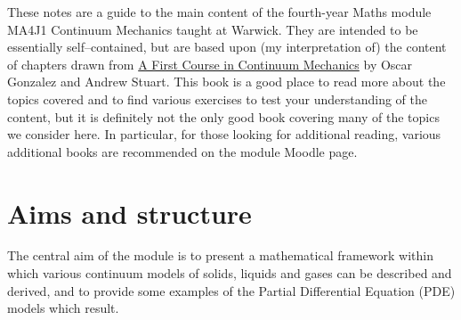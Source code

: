 \documentclass[
  letterpaper,
  DIV=11,
  numbers=noendperiod]{scrreprt}
\theoremstyle{plain}
\theoremstyle{remark}
\begin{document}
\newcommand{\bftau}{{\boldsymbol{\tau}}}
\newcommand{\bfnu}{{\boldsymbol{\nu}}}
\newcommand{\bfpsi}{{\boldsymbol{\psi}}}
\newcommand{\bfphi}{{\boldsymbol{\varphi}}}
\newcommand{\bfSigma}{{\boldsymbol{\Sigma}}}
\newcommand{\calI}{{\mathcal{I}}}
\newcommand{\calN}{{\mathcal{N}}}
\newcommand{\calV}{{\mathcal{V}}}
\newcommand{\bbE}{{\mathbb{E}}}
\newcommand{\bbR}{{\mathbb{R}}}
\newcommand{\bbC}{{\mathbb{C}}}
\newcommand{\bsfC}{{\mathsf{C}}}
\newcommand{\bsfD}{{\mathsf{D}}}
\newcommand{\bsfI}{{\mathsf{I}}}
\newcommand{\bsfO}{{\mathsf{O}}}
\newcommand{\tr}{{\operatorname{tr}}}
\newcommand{\sym}{{\operatorname{sym}}}
\newcommand{\skw}{{\operatorname{skew}}}
\newcommand{\vc}{{\operatorname{vec}}}
\newcommand{\ten}{{\operatorname{ten}}}
\newcommand{\cof}{{\operatorname{cof}}}
\newcommand{\mass}{{\operatorname{mass}}}
\newcommand{\vol}{{\operatorname{vol}}}
\newcommand{\area}{{\operatorname{area}}}
\newcommand{\com}{{\operatorname{com}}}
\newcommand{\cov}{{\operatorname{cov}}}
\newcommand{\e}{{\mathrm{e}}}
\newcommand{\D}{{\mathrm{D}}}
\newcommand{\dd}{{\mathrm{d}}}
\newcommand{\dt}{{\dd t}}
\newcommand{\Dt}{{\D t}}
\newcommand{\bigO}{{O}}
\newcommand{\litO}{{o}}
\newcommand{\dVx}{{\,\d V_{\bfx}}}
\newcommand{\dAx}{{\,\d A_{\bfx}}}
\newcommand{\dVy}{{\,\d V_{\bfy}}}
\newcommand{\dAy}{{\,\d A_{\bfy}}}
\newcommand{\ds}{{\,\d s}}

These notes are a guide to the main content of the fourth-year Maths
module MA4J1 Continuum Mechanics taught at Warwick. They are intended to
be essentially self--contained, but are based upon (my interpretation
of) the content of chapters drawn from
\href{https://go.exlibris.link/CMjyhLvJ}{A First Course in Continuum
Mechanics} by Oscar Gonzalez and Andrew Stuart. This book is a good
place to read more about the topics covered and to find various
exercises to test your understanding of the content, but it is
definitely not the only good book covering many of the topics we
consider here. In particular, for those looking for additional reading,
various additional books are recommended on the module Moodle page.

\section*{Aims and structure}\label{aims-and-structure}


The central aim of the module is to present a mathematical framework
within which various continuum models of solids, liquids and gases can
be described and derived, and to provide some examples of the Partial
Differential Equation (PDE) models which result.
\end{document}
